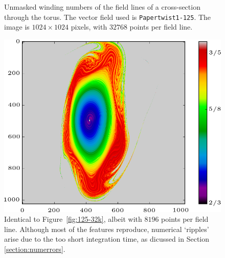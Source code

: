 \documentclass[a4paper]{article}
\begin{document}
\begin{figure}[!hb]
	\caption{Unmasked winding numbers of the field lines of a cross-section through the torus. The vector field used is \texttt{Papertwist1-125}. The image is $1024\times 1024$ pixels, with $32768$ points per field line.}\label{fig:125-unmasked}
\endminipage\hfill
{}
  \includegraphics[width=\linewidth]{Figures/Rings_Papertwist_twist1_125_steps8k.png}
	\caption{Identical to Figure~\ref{fig:125-32k}, albeit with $8196$ points per field line. Although most of the features reproduce, numerical `ripples' arise due to the too short integration time, as dicussed in Section \ref{section:numerrors}.}\label{fig:125-8k}
\endminipage
\end{figure}

\FloatBarrier
\end{document}
